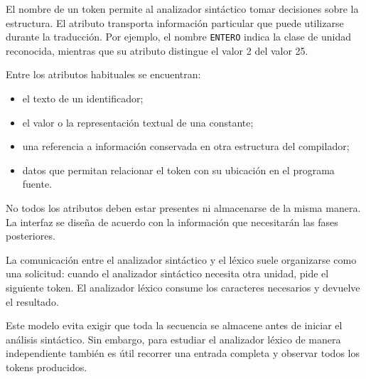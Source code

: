 \documentclass[11pt,spanish]{article}
\begin{document}
El nombre de un token permite al analizador sintáctico tomar decisiones sobre la estructura. El atributo transporta información particular que puede utilizarse durante la traducción. Por ejemplo, el nombre \texttt{ENTERO} indica la clase de unidad reconocida, mientras que su atributo distingue el valor 2 del valor 25.

Entre los atributos habituales se encuentran:

\begin{itemize}
    \item el texto de un identificador;
    \item el valor o la representación textual de una constante;
    \item una referencia a información conservada en otra estructura del compilador;
    \item datos que permitan relacionar el token con su ubicación en el programa fuente.
\end{itemize}

No todos los atributos deben estar presentes ni almacenarse de la misma manera. La interfaz se diseña de acuerdo con la información que necesitarán las fases posteriores.

La comunicación entre el analizador sintáctico y el léxico suele organizarse como una solicitud: cuando el analizador sintáctico necesita otra unidad, pide el siguiente token. El analizador léxico consume los caracteres necesarios y devuelve el resultado.

\begin{center}
\end{center}

Este modelo evita exigir que toda la secuencia se almacene antes de iniciar el análisis sintáctico. Sin embargo, para estudiar el analizador léxico de manera independiente también es útil recorrer una entrada completa y observar todos los tokens producidos.
\end{document}
